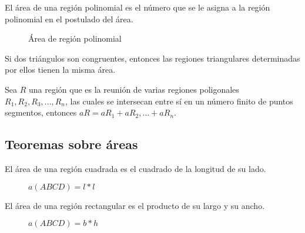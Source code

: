 \begin{definition}
    El área de una región polinomial es el número que se le asigna a la región polinomial en el postulado del área.

    \begin{figure}[!h]
        \centering
        
        \caption{Área de región polinomial}
        \label{fig:area-polinomial}
    \end{figure}
    
\end{definition}

\begin{postulate}
    Si dos triángulos son congruentes, entonces las regiones triangulares determinadas por ellos tienen la misma área.
\end{postulate}

\begin{postulate}
    Sea $R$ una región que es la reunión de varias regiones poligonales $R_1,R_2,R_3,\dots,R_n$, las cuales se intersecan entre sí en un número finito de puntos segmentos, entonces $aR = aR_1 + aR_2, \dots + aR_n$.
\end{postulate}

\clearpage

\subsection{Teoremas sobre áreas}

\begin{postulate}
    El área de una región cuadrada es el cuadrado de la longitud de su lado.

    \begin{figure}[!h]
        \centering
        
        \caption{$a(ABCD) = l * l$}
        \label{fig:area-cuadrado}
    \end{figure}
    
\end{postulate}

\begin{theorem}
    El área de una región rectangular es el producto de su largo y su ancho.

    \begin{figure}[!h]
        \centering
        
        \caption{$a(ABCD) = b * h$}
        \label{fig:area-rectangular}
    \end{figure}
    
\end{theorem}

